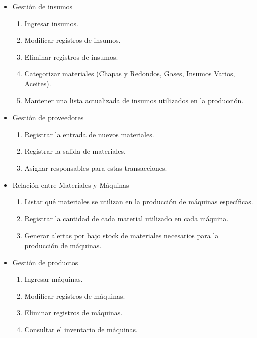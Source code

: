 \documentclass{article}
\begin{document}
\begin{itemize}
	\item Gestión de insumos
	\begin{enumerate}
		\item Ingresar insumos.
		\item Modificar registros de insumos.
		\item Eliminar registros de insumos.
		\item Categorizar materiales (Chapas y Redondos, Gases, Insumos Varios, Aceites).
		\item Mantener una lista actualizada de insumos utilizados en la producción.
	\end{enumerate}
\end{itemize}

\begin{itemize}
	\item Gestión de proveedores
	\begin{enumerate}[start=6]
		\item Registrar la entrada de nuevos materiales.
		\item Registrar la salida de materiales.
		\item Asignar responsables para estas transacciones.
	\end{enumerate}
\end{itemize}

\begin{itemize}
	\item Relación entre Materiales y Máquinas
	\begin{enumerate}[start=9]
		\item Listar qué materiales se utilizan en la producción de máquinas específicas.
		\item Registrar la cantidad de cada material utilizado en cada máquina.
		\item Generar alertas por bajo stock de materiales necesarios para la producción de máquinas.
	\end{enumerate}
\end{itemize}

\begin{itemize}
	\item Gestión de productos
	\begin{enumerate}[start=12]
		\item Ingresar máquinas.
		\item Modificar registros de máquinas.
		\item Eliminar registros de máquinas.
		\item Consultar el inventario de máquinas.
	\end{enumerate}
\end{itemize}
\end{document}
